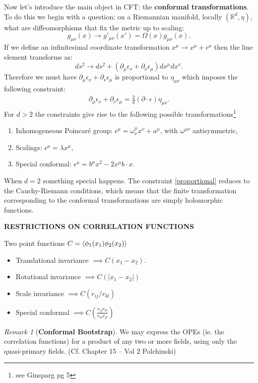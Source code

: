 \documentclass{report}
\theoremstyle{plain}
\theoremstyle{definition}
\theoremstyle{remark}
\newtheorem*{remark}{Remark}
\newcommand{\FR}[2]{\frac{#1}{#2}}
\newcommand{\di}{\partial}
\newcommand{\colr}[1]{ {\color{red} #1 } }
\newcommand{\bR}{\mathbb{R}}
\begin{document}
Now let's introduce the main object in CFT: the \textbf{conformal
transformations}. To do this we begin with a question: on a Riemannian
manifold, locally $(\bR^d,\eta)$, what are diffeomorphisms that fix the
metric up to scaling:
\[ g_{\mu\nu}(x) \to g'_{\mu\nu}(x') = \Omega(x)g_{\mu\nu}(x). \]
If we define an infinitesimal coordinate transformation $x^\mu \to
x^\mu+\epsilon^\mu$ then the line element transforms as:
\[ds^2\to ds^2+(\di_\mu\epsilon_\nu+\di_\nu\epsilon_\mu)dx^\mu dx^\nu.\]
Therefore we must have $\di_\mu\epsilon_\nu+\di_\nu\epsilon_\mu$ is
proportional to $\eta_{\mu\nu}$ which imposes the following constraint:
\begin{align}
\di_\mu\epsilon_\nu + \di_\nu\epsilon_\mu = \FR{2}{d}(\di\cdot
\epsilon)\eta_{\mu\nu}.
    \label{proportional}
\end{align}
For $d>2$ the constraints give rise to the following possible
transformations\footnote{see Ginsparg pg 5}
\begin{enumerate}
    \item Inhomogeneous Poincar\'e group: $\epsilon^\mu = \omega^\mu_\nu
        x^\nu + a^\mu$, with $\omega^{\mu\nu}$ antisymmetric,
    \item Scalings: $\epsilon^\mu = \lambda x^\mu$,
    \item Special conformal: $\epsilon^\mu = b^\mu x^2 - 2x^\mu b\cdot x$.
\end{enumerate}
When $d=2$ something special happens. The constraint \eqref{proportional}
reduces to the Cauchy-Riemann conditions, which means that the finite
transformation corresponding to the conformal transformations are simply
holomorphic functions.

\colr{\textbf{RESTRICTIONS ON CORRELATION FUNCTIONS}}

Two point functions $C = \braket{\phi_1(x_1)\phi_2(x_2)}$
\begin{itemize}
    \item Translational invariance $\implies C(x_1-x_2)$.
    \item Rotational invariance $\implies C(|x_1-x_2|)$
    \item Scale invariance $\implies C(r_{ij}/r_{kl})$
    \item Special conformal $\implies C(\FR{r_{ij}r_{kl}}{r_{ik}r_{jl}})$
\end{itemize}

\begin{remark}[\textbf{Conformal Bootstrap}]
    We may express the OPEs (ie. the correlation functions) for a product
    of any two or more fields, using only the quasi-primary fields. (Cf.
    Chapter 15 -- Vol 2 Polchinski)
\end{remark}
\end{document}
